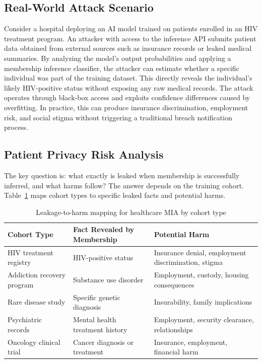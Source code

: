 \documentclass[conference]{IEEEtran}
\begin{document}
	\subsection{Real-World Attack Scenario}

Consider a hospital deploying an AI model trained on patients enrolled in an HIV treatment program. An attacker with access to the inference API submits patient data obtained from external sources such as insurance records or leaked medical summaries. By analyzing the model's output probabilities and applying a membership inference classifier, the attacker can estimate whether a specific individual was part of the training dataset.
This directly reveals the individual's likely HIV-positive status without exposing any raw medical records. The attack operates through black-box access and exploits confidence differences caused by overfitting. In practice, this can produce insurance discrimination, employment risk, and social stigma without triggering a traditional breach notification process.
	\subsection{Patient Privacy Risk Analysis}
	The key question is: what exactly is leaked when membership is successfully inferred, and what harms follow? The answer depends on the training cohort. Table~\ref{tab:leakage} maps cohort types to specific leaked facts and potential harms.

	\begin{table}[H]
		\centering
		\caption{Leakage-to-harm mapping for healthcare MIA by cohort type}
		\label{tab:leakage}
		\scriptsize
		\begin{tabularx}{\linewidth}{>{\raggedright\arraybackslash}p{1.7cm} >{\raggedright\arraybackslash}X >{\raggedright\arraybackslash}X}
			\toprule
			Cohort Type & Fact Revealed by Membership & Potential Harm \\
			\midrule
			HIV treatment registry & HIV-positive status & Insurance denial, employment discrimination, stigma \\
			Addiction recovery program & Substance use disorder & Employment, custody, housing consequences \\
			Rare disease study & Specific genetic diagnosis & Insurability, family implications \\
			Psychiatric records & Mental health treatment history & Employment, security clearance, relationships \\
			Oncology clinical trial & Cancer diagnosis or treatment & Insurance, employment, financial harm \\
			\bottomrule
		\end{tabularx}
	\end{table}
\end{document}
